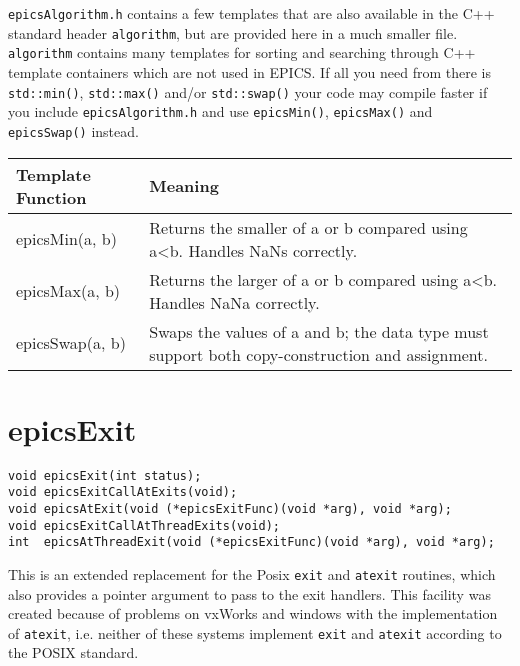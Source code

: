 \verb|epicsAlgorithm.h| contains a few templates that are also available in the C++ standard header \verb|algorithm|, but are provided here in a much smaller file.
\verb|algorithm| contains many templates for sorting and searching through C++ template containers which are not used in EPICS.
If all you need from there is \verb|std::min()|, \verb|std::max()| and/or \verb|std::swap()| your code may compile faster if you include \verb|epicsAlgorithm.h| and use \verb|epicsMin()|, \verb|epicsMax()| and \verb|epicsSwap()| instead.

\begin{center}
\begin{longtable}{p{1.5in}p{4.25in}}
\textbf{Template Function} & \textbf{Meaning}\\
\hline
epicsMin(a, b) & Returns the smaller of a or b compared using a\textless{}b. Handles NaNs correctly.\\
epicsMax(a, b) & Returns the larger of a or b compared using a\textless{}b. Handles NaNa correctly.\\
epicsSwap(a, b) & Swaps the values of a and b; the data type must support both copy-construction and assignment.
\end{longtable}

\end{center}


\section{epicsExit}

\begin{verbatim}
void epicsExit(int status);
void epicsExitCallAtExits(void);
void epicsAtExit(void (*epicsExitFunc)(void *arg), void *arg);
void epicsExitCallAtThreadExits(void);
int  epicsAtThreadExit(void (*epicsExitFunc)(void *arg), void *arg);
\end{verbatim}

This is an extended replacement for the Posix \verb|exit| and \verb|atexit| routines, which also provides a pointer argument to pass to the exit handlers.
This facility was created because of problems on vxWorks and windows with the implementation of \verb|atexit|, i.e. neither of these systems implement \verb|exit| and \verb|atexit| according to the POSIX standard.

